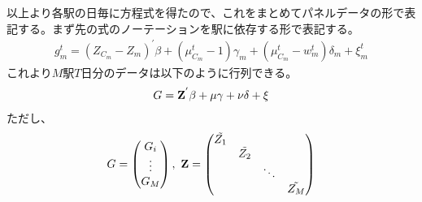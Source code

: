 \documentclass{jsarticle}
\begin{document}
以上より各駅の日毎に方程式を得たので、これをまとめてパネルデータの形で表記する。まず先の式のノーテーションを駅に依存する形で表記する。
\begin{align*}
	g_m^t = (Z_{C_m} - Z_m)^{'} \beta + \left(\mu_{C_m}^t-1\right)\gamma_m + (\mu_{C_m}^t - w_m^t)\delta_m + \xi_m^t
\end{align*}
これより$M$駅$T$日分のデータは以下のように行列できる。
\begin{align*}
	G = {\bf Z}^{'}\beta + {\bf \mu} \gamma + {\bf \nu} \delta + \xi
\end{align*}
ただし、
\begin{align*}
	G = \begin{pmatrix} G_i\\
	\vdots\\
	G_M\end{pmatrix},\ {\bf Z} = \begin{pmatrix} \tilde{Z_1}&&&\\
	&\tilde{Z_2}&&\\
	&&\ddots&\\
	&&&\tilde{Z_M}
	\end{pmatrix}
\end{align*}
\end{document}
